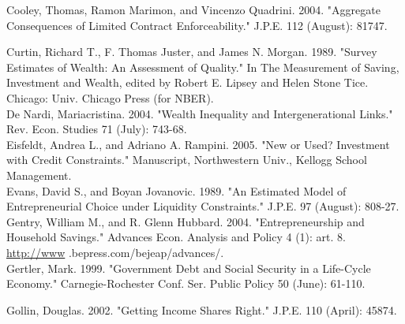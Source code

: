 \documentclass[10pt]{article}
\begin{document}
Cooley, Thomas, Ramon Marimon, and Vincenzo Quadrini. 2004. "Aggregate Consequences of Limited Contract Enforceability." J.P.E. 112 (August): 81747.

Curtin, Richard T., F. Thomas Juster, and James N. Morgan. 1989. "Survey Estimates of Wealth: An Assessment of Quality." In The Measurement of Saving, Investment and Wealth, edited by Robert E. Lipsey and Helen Stone Tice. Chicago: Univ. Chicago Press (for NBER).\\
De Nardi, Mariacristina. 2004. "Wealth Inequality and Intergenerational Links." Rev. Econ. Studies 71 (July): 743-68.\\
Eisfeldt, Andrea L., and Adriano A. Rampini. 2005. "New or Used? Investment with Credit Constraints." Manuscript, Northwestern Univ., Kellogg School Management.\\
Evans, David S., and Boyan Jovanovic. 1989. "An Estimated Model of Entrepreneurial Choice under Liquidity Constraints." J.P.E. 97 (August): 808-27.\\
Gentry, William M., and R. Glenn Hubbard. 2004. "Entrepreneurship and Household Savings." Advances Econ. Analysis and Policy 4 (1): art. 8. \href{http://www}{http://www} .bepress.com/bejeap/advances/.\\
Gertler, Mark. 1999. "Government Debt and Social Security in a Life-Cycle Economy." Carnegie-Rochester Conf. Ser. Public Policy 50 (June): 61-110.

Gollin, Douglas. 2002. "Getting Income Shares Right." J.P.E. 110 (April): 45874.
\end{document}
